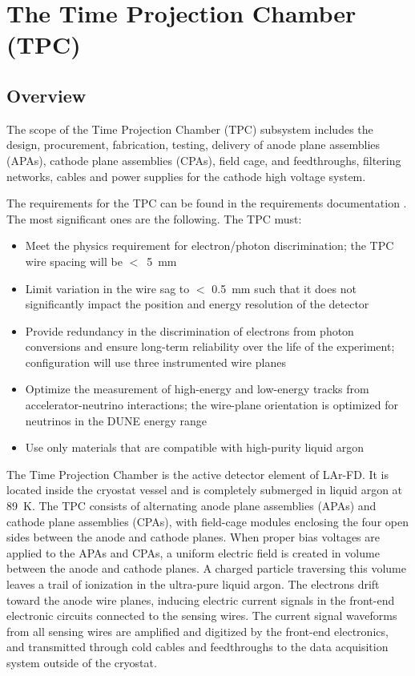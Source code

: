 
\section{The Time Projection Chamber (TPC)} 
\label{sec:detectors-fd-ref-tpc}

\subsection{Overview}

The scope of the Time Projection Chamber (TPC) subsystem includes the design, procurement, fabrication, testing, delivery of  anode plane assemblies (APAs),  cathode plane assemblies (CPAs), field cage, and feedthroughs, filtering networks, cables and power supplies for the cathode high voltage system.

The requirements for the TPC can be found in the requirements documentation \cite{lar-fd-req}. The most significant ones are the following. The TPC must:

\begin{itemize}	
\item Meet the physics requirement for electron/photon discrimination;  the TPC wire spacing will be $<$~5~mm
\item Limit variation in the wire sag to $<$ 0.5~mm such that it does not significantly impact the position and energy resolution of the detector
\item Provide redundancy in the discrimination of electrons from photon conversions and ensure long-term reliability over the life of the experiment;  configuration will use three instrumented wire planes
\item Optimize the measurement of high-energy and low-energy tracks from accelerator-neutrino interactions; the wire-plane orientation is optimized for neutrinos in the DUNE energy range
\item Use only materials that are compatible with high-purity liquid argon
\end{itemize}

The Time Projection Chamber is the active detector element of LAr-FD. It is located inside the cryostat 
vessel and is completely submerged in liquid argon at 89~K. The TPC consists of alternating anode plane 
assemblies (APAs) and cathode plane assemblies (CPAs), with field-cage modules enclosing the four open sides between the anode and cathode planes.
When proper bias voltages are applied to the APAs and CPAs, a uniform electric field is created in volume between the anode and cathode planes. A charged particle traversing this volume leaves a trail of 
ionization in the ultra-pure liquid argon.  The electrons drift toward the anode wire planes, inducing electric current signals in the front-end electronic circuits connected to the sensing wires.  The current 
signal waveforms from all sensing wires are amplified and digitized by the front-end electronics, and transmitted through cold cables and feedthroughs to the data acquisition system outside of the cryostat.


